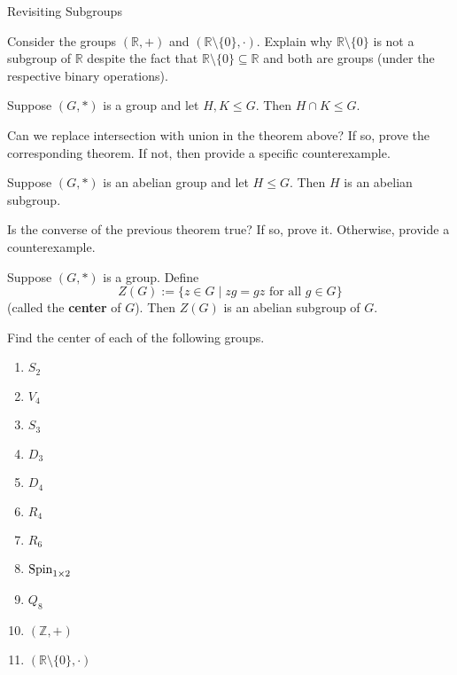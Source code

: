 \begin{section}{Revisiting Subgroups}
\begin{exercise}
Consider the groups $(\mathbb{R},+)$ and $(\mathbb{R}\setminus\{0\},\cdot)$.  Explain why $\mathbb{R}\setminus\{0\}$ is not a subgroup of $\mathbb{R}$ despite the fact that $\mathbb{R}\setminus\{0\}\subseteq\mathbb{R}$ and both are groups (under the respective binary operations).
\end{exercise}

\begin{theorem}
Suppose $(G,*)$ is a group and let $H,K\leq G$.  Then $H\cap K\leq G$.
\end{theorem}

\begin{problem}
Can we replace intersection with union in the theorem above?  If so, prove the corresponding theorem.  If not, then provide a specific counterexample.
\end{problem}

\begin{theorem}
Suppose $(G,*)$ is an abelian group and let $H\leq G$.  Then $H$ is an abelian subgroup.
\end{theorem}

\begin{problem}
Is the converse of the previous theorem true?  If so, prove it.  Otherwise, provide a counterexample.
\end{problem}

\begin{theorem}
Suppose $(G,*)$ is a group.  Define
\[
Z(G):=\{z\in G\mid zg=gz\text{ for all } g\in G\}
\]
(called the \textbf{center} of $G$).  Then $Z(G)$ is an abelian subgroup of $G$.
\end{theorem}

\begin{exercise}
Find the center of each of the following groups.
\begin{enumerate}[label=\rm{(\alph*)}]
\item $S_2$
\item $V_4$
\item $S_3$
\item $D_3$
\item $D_4$
\item $R_4$
\item $R_6$
\item $\operatorname{Spin}_{1\times 2}$
\item $Q_8$
\item $(\mathbb{Z},+)$
\item $(\mathbb{R}\setminus\{0\},\cdot)$
\end{enumerate}
\end{exercise}


\end{section}
